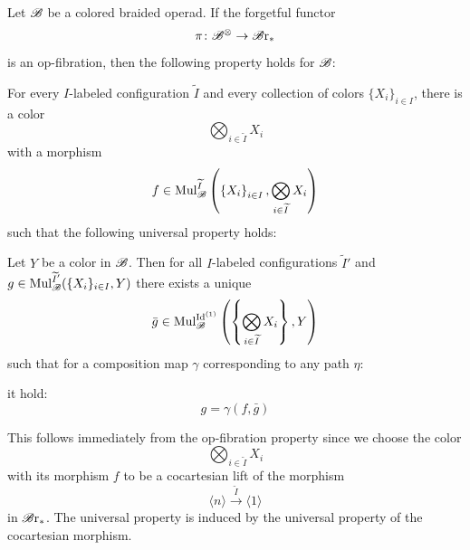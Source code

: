 \begin{rem}
    Let $\mathscr{B}$ be a colored braided operad. 
    If the forgetful functor
    \[
        \pi \colon \mathscr{B}^{\otimes} \to \mathscr{B} \text{r}_{\ast}
    \]
    is an op-fibration, then the following property holds for $\mathscr{B}$:

    For every $I$-labeled
    configuration $\widetilde{I}$ and every collection of colors $\{X_i\}_{i \in I}$,
    there is a color
    \[
    \bigotimes_{i \in \widetilde{I}} X_i
    \]
    with a morphism
    \[
    f \in \operatorname{Mul}_{\mathscr{B}}^{\widetilde{I}}\left(\left\{X_i\right\}_{i \in I}, \bigotimes_{i \in \widetilde{I}} X_i\right)
    \]
    such that the following universal property holds:
    
    Let $Y$ be a color in
    $\mathscr{B}$. Then for all $I$-labeled configurations $\widetilde{I}'$ and $g \in
    \operatorname{Mul}_{\mathscr{B}}^{\widetilde{I}'}(\{X_i\}_{i \in I}, Y)$ there exists a unique
    $$\bar{g} \in \operatorname{Mul}_{\mathscr{B}}^{\operatorname{Id}^{(1)}}\left(\left\{\bigotimes_{i \in
    \widetilde{I}} X_i\right\}, Y\right)$$
    such that for a composition map $\gamma$ corresponding to any path $\eta$:
    \begin{center}
    \end{center}
    it hold:
    \[
        g = \gamma(f, \bar{g})
    \]

    This follows immediately from the op-fibration property since
    we choose the color 
    \[
    \bigotimes_{i \in \widetilde{I}} X_i
    \]
    with its morphism $f$ to be a cocartesian lift of the morphism
    \[
        \langle n \rangle \overset{\widetilde{I}}{\to} \langle 1 \rangle
    \]
    in $\mathscr{B} \text{r}_{\ast}$. The universal property is induced 
    by the universal property of the cocartesian morphism.
\end{rem}



